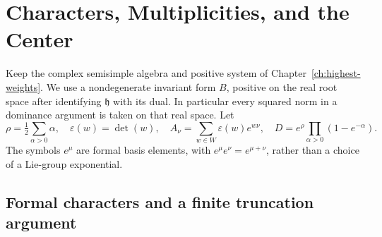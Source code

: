 \chapter{Characters, Multiplicities, and the Center}
\label{ch:characters}

Keep the complex semisimple algebra and positive system of
Chapter~\ref{ch:highest-weights}. We use a nondegenerate invariant
form \(B\), positive on the real root space after identifying
\(\mathfrak h\) with its dual. In particular every squared norm
in a dominance argument is taken on that real space.
Let
\[
 \rho=\tfrac12\sum_{\alpha>0}\alpha,\quad
 \varepsilon(w)=\det(w),\quad
 A_\nu=\sum_{w\in W}\varepsilon(w)e^{w\nu},\quad
 D=e^\rho\prod_{\alpha>0}(1-e^{-\alpha}).
\]
The symbols \(e^\mu\) are formal basis elements, with
\(e^\mu e^\nu=e^{\mu+\nu}\), rather than a choice of a Lie-group
exponential.

\section{Formal characters and a finite truncation argument}

